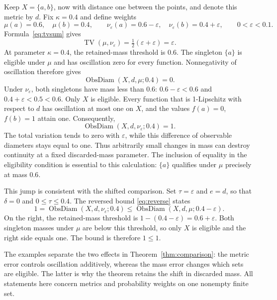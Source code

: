 \documentclass[a4paper,11pt]{article}
\DeclareMathOperator{\ObsDiam}{ObsDiam}
\DeclareMathOperator{\TV}{TV}
\begin{document}
Keep $X=\{a,b\}$, now with distance one between the points, and denote
this metric by $d$. Fix $\kappa=0.4$ and define weights
\[
 \mu(a)=0.6,\quad\mu(b)=0.4,
 \qquad
 \nu_\varepsilon(a)=0.6-\varepsilon,\quad
 \nu_\varepsilon(b)=0.4+\varepsilon,
 \qquad 0<\varepsilon<0.1.
\]
Formula~\eqref{eq:tvsum} gives
\[
 \TV(\mu,\nu_\varepsilon)
 =\tfrac12(\varepsilon+\varepsilon)=\varepsilon.
\]
At parameter $\kappa=0.4$, the retained-mass threshold is $0.6$.
The singleton $\{a\}$ is eligible under $\mu$ and has oscillation
zero for every function. Nonnegativity of oscillation therefore gives
\[
 \ObsDiam(X,d,\mu;0.4)=0.
\]
Under $\nu_\varepsilon$, both singletons have mass less than $0.6$:
$0.6-\varepsilon<0.6$ and $0.4+\varepsilon<0.5<0.6$.
Only $X$ is eligible. Every function that is 1-Lipschitz with respect to $d$ has oscillation
at most one on $X$, and the values $f(a)=0$, $f(b)=1$ attain one.
Consequently,
\[
 \ObsDiam(X,d,\nu_\varepsilon;0.4)=1.
\]
The total variation tends to zero with $\varepsilon$, while this
difference of observable diameters stays equal to one. Thus arbitrarily
small changes in mass can destroy continuity at a fixed discarded-mass
parameter. The inclusion of equality in the eligibility condition is
essential to this calculation: $\{a\}$ qualifies under $\mu$ precisely
at mass $0.6$.

This jump is consistent with the shifted comparison. Set
$\tau=\varepsilon$ and $e=d$, so that $\delta=0$ and
$0\le\tau\le0.4$. The reversed bound \eqref{eq:reverse} states
\[
 1=\ObsDiam(X,d,\nu_\varepsilon;0.4)
 \le\ObsDiam(X,d,\mu;0.4-\varepsilon).
\]
On the right, the retained-mass threshold is
$1-(0.4-\varepsilon)=0.6+\varepsilon$. Both singleton masses under
$\mu$ are below this threshold, so only $X$ is eligible and the
right side equals one. The bound is therefore $1\le1$.

The examples separate the two effects in Theorem~\ref{thm:comparison}:
the metric error controls oscillation additively, whereas the mass error
changes which sets are eligible. The latter is why the theorem retains
the shift in discarded mass. All statements here concern metrics and
probability weights on one nonempty finite set.
\end{document}
